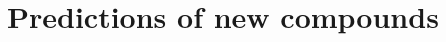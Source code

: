 \begin{comment}

\begin{figure}[!tbp]
  \centering
  \texttt{[image: ../predicting-perovskites/reports/figures/contours/perovskite.pdf]}
  \vspace*{-130mm}
  \caption{Decision boundaries of the four models from training on the feature pair $r_B$ and $t$.}
  \label{fig:decision-boundaries}
\end{figure}

\begin{figure}[!tbp]
  \texttt{[image: ../predicting-perovskites/reports/figures/falseNegatives-cubic:True]}
  \vspace*{-130mm}
  \caption{Dette kan vendes på 90 grader?}
  \label{fig:h2-fn}
\end{figure}

\begin{figure}[!tbp]
  \texttt{[image: ../predicting-perovskites/reports/figures/falsePositives-cubic:True]}
  \vspace*{-130mm}
  \caption{Dette kan vendes på 90 grader?}
  \label{fig:h2-fp}
\end{figure}
\end{comment}


\section{Predictions of new compounds}
